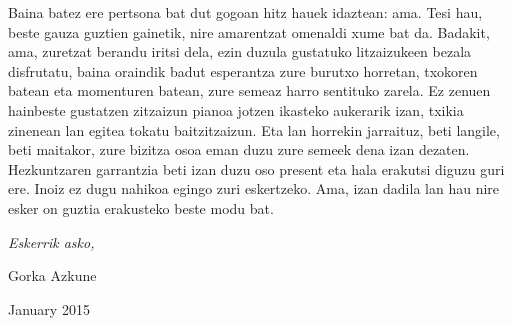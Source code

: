 \begin{acknowledgements}
Baina batez ere pertsona bat dut gogoan hitz hauek idaztean: ama. Tesi hau, beste gauza guztien gainetik, nire amarentzat omenaldi xume bat da. Badakit, ama, zuretzat berandu iritsi dela, ezin duzula gustatuko litzaizukeen bezala disfrutatu, baina oraindik badut esperantza zure burutxo horretan, txokoren batean eta momenturen batean, zure semeaz harro sentituko zarela. Ez zenuen hainbeste gustatzen zitzaizun pianoa jotzen ikasteko aukerarik izan, txikia zinenean lan egitea tokatu baitzitzaizun. Eta lan horrekin jarraituz, beti langile, beti maitakor, zure bizitza osoa eman duzu zure semeek dena izan dezaten. Hezkuntzaren garrantzia beti izan duzu oso present eta hala erakutsi diguzu guri ere. Inoiz ez dugu nahikoa egingo zuri eskertzeko. Ama, izan dadila lan hau nire esker on guztia erakusteko beste modu bat. 


\begin{flushright}
\textit{Eskerrik asko,}

Gorka Azkune

January 2015







\end{flushright}



\end{acknowledgements}




